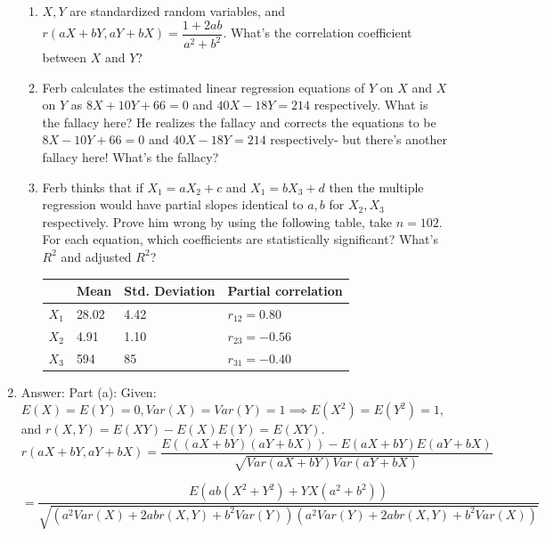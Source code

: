 \documentclass[12pt, oneside]{article}
\begin{document}
\begin{enumerate}
\begin{enumerate}
    \item $X,Y$ are standardized random variables, and $r(aX+bY,aY+bX) = \dfrac{1+2ab}{a^2+b^2}$. What's the correlation coefficient between $X$ and $Y$?
    \item Ferb calculates the estimated linear regression equations of $Y$ on $X$ and $X$ on $Y$ as $8X + 10Y + 66 = 0$ and $40X - 18Y = 214$ respectively. What is the fallacy here? He realizes the fallacy and corrects the equations to be $8X - 10Y + 66 = 0$ and $40X - 18Y = 214$ respectively- but there's another fallacy here! What's the fallacy?
    \item Ferb thinks that if $X_1 = aX_2 + c$ and $X_1 = bX_3 + d$ then the multiple regression would have partial slopes identical to $a,b$ for $X_2,X_3$ respectively. Prove him wrong by using the following table, take $n=102$. For each equation, which coefficients are statistically significant? What's $R^2$ and adjusted $R^2$? 
    \begin{table}[!ht]
    \centering
    \begin{tabular}{|l|l|l|l|}
    \hline
          & Mean  & Std. Deviation & Partial correlation \\ \hline
    $X_1$ & 28.02 & 4.42           & $r_{12} = 0.80$     \\ \hline
    $X_2$ & 4.91  & 1.10           & $r_{23} = -0.56$    \\ \hline
    $X_3$ & 594   & 85             & $r_{31} = -0.40$    \\ \hline
    \end{tabular}
    \end{table}
\end{enumerate}
\item 

Answer:
\newline Part (a): Given: $E(X) = E(Y) = 0, Var(X) = Var(Y) = 1 \implies E(X^2) = E(Y^2) = 1,$ and $r(X,Y) = E(XY) - E(X)E(Y) = E(XY).$
$$
r(aX+bY, aY+bX) = \dfrac{E((aX+bY)(aY+bX))-E(aX+bY)E( aY+bX)}{\sqrt{Var(aX+bY) Var(aY+bX)}}$$

$$ = \dfrac{E(ab(X^2+Y^2)+YX(a^2+b^2))}{\sqrt{(a^2 Var(X) + 2abr(X,Y) + b^2  Var(Y))(a^2 Var(Y) + 2abr(X,Y) + b^2  Var(X))}}$$


\end{enumerate}
\end{document}
